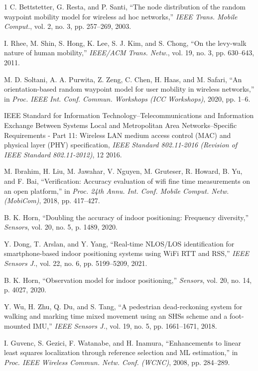 \documentclass[journal]{IEEEtran}
\begin{document}
\begin{thebibliography}{1}
C. Bettstetter, G. Resta, and P. Santi, ``The node distribution of the random waypoint mobility model for wireless ad hoc networks,'' \emph{IEEE Trans. Mobile Comput.}, vol. 2, no. 3, pp. 257–269, 2003.

I. Rhee, M. Shin, S. Hong, K. Lee, S. J. Kim, and S. Chong, ``On the levy-walk nature of human mobility,'' \emph{IEEE/ACM Trans. Netw.}, vol. 19, no. 3, pp. 630–643, 2011.

M. D. Soltani, A. A. Purwita, Z. Zeng, C. Chen, H. Haas, and M. Safari, ``An orientation-based random waypoint model for user mobility in wireless networks,'' in \emph{Proc. IEEE Int. Conf. Commun. Workshops (ICC Workshops)}, 2020, pp. 1–6.

IEEE Standard for Information Technology–Telecommunications and Information Exchange Between Systems Local and Metropolitan Area Networks–Specific Requirements - Part 11: Wireless LAN medium access control (MAC) and physical layer (PHY) specification, \emph{IEEE Standard 802.11-2016 (Revision of IEEE Standard 802.11-2012)}, 12 2016.

M. Ibrahim, H. Liu, M. Jawahar, V. Nguyen, M. Gruteser, R. Howard, B. Yu, and F. Bai, ``Verification: Accuracy evaluation of wifi fine time measurements on an open platform,'' in \emph{Proc. 24th Annu. Int. Conf. Mobile Comput. Netw. (MobiCom)}, 2018, pp. 417–427.

B. K. Horn, ``Doubling the accuracy of indoor positioning: Frequency diversity,'' \emph{Sensors}, vol. 20, no. 5, p. 1489, 2020.

Y. Dong, T. Arslan, and Y. Yang, ``Real-time NLOS/LOS identification for smartphone-based indoor positioning systems using WiFi RTT and RSS,'' \emph{IEEE Sensors J.}, vol. 22, no. 6, pp. 5199–5209, 2021.

B. K. Horn, ``Observation model for indoor positioning,'' \emph{Sensors}, vol. 20, no. 14, p. 4027, 2020.

Y. Wu, H. Zhu, Q. Du, and S. Tang, ``A pedestrian dead-reckoning system for walking and marking time mixed movement using an SHSs scheme and a foot-mounted IMU,'' \emph{IEEE Sensors J.}, vol. 19, no. 5, pp. 1661–1671, 2018.

I. Guvenc, S. Gezici, F. Watanabe, and H. Inamura, ``Enhancements to linear least squares localization through reference selection and ML estimation,'' in \emph{Proc. IEEE Wireless Commun. Netw. Conf. (WCNC)}, 2008, pp. 284–289.


\end{thebibliography}
\end{document}
